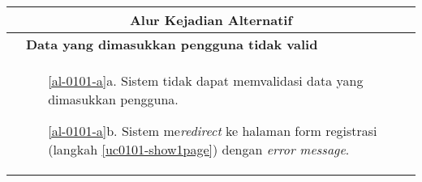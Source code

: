 \begin{table}[H]
\begin{tabular}{|r|p{8cm}|}
		\multicolumn{2}{|c|}{\textbf{Alur Kejadian Alternatif}}                                                         \\ \hline
		\multicolumn{1}{|l|}{}                                           & \textbf{Data yang dimasukkan pengguna tidak valid}
			\\ \hline
		\multicolumn{1}{|l|}{}                                           & 
			 \begin{itemize}
			 	\item[\ref{al-0101-a}a.] Sistem tidak dapat memvalidasi data yang dimasukkan pengguna.
			 	\item[\ref{al-0101-a}b.] Sistem me\textit{redirect} ke halaman form registrasi (langkah \ref{uc0101-show1page}) dengan \textit{error message}.
			 \end{itemize}
		 \\ \hline
	\end{tabular}
\end{table}